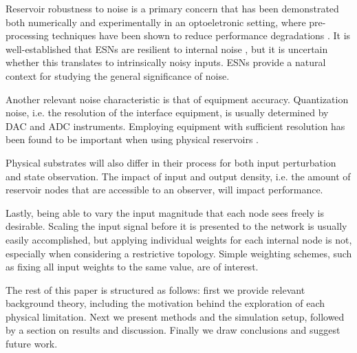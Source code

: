 Reservoir robustness to noise is a primary concern that has been demonstrated
both numerically and experimentally in an optoeletronic setting, where
pre-processing techniques have been shown to reduce performance degradations
\cite{soriano_optoelectronic_2013}. It is well-established that ESNs are
resilient to internal noise \cite{jaeger_echo_2001}, but it is uncertain whether
this translates to intrinsically noisy inputs. ESNs provide a natural context
for studying the general significance of noise.

Another relevant noise characteristic is that of equipment
accuracy. Quantization noise, i.e. the resolution of the interface equipment, is
usually determined by DAC and ADC instruments. Employing equipment with
sufficient resolution has been found to be important when using physical
reservoirs \cite{soriano_delay-based_2015}.

Physical substrates will also differ in their process for both input
perturbation and state observation. The impact of input and output density,
i.e. the amount of reservoir nodes that are accessible to an observer, will
impact performance.

Lastly, being able to vary the input magnitude that each node sees freely is
desirable. Scaling the input signal before it is presented to the network is
usually easily accomplished, but applying individual weights for each internal
node is not, especially when considering a restrictive topology. Simple
weighting schemes, such as fixing all input weights to the same value, are of
interest.

The rest of this paper is structured as follows: first we provide relevant
background theory, including the motivation behind the exploration of each
physical limitation. Next we present methods and the simulation setup, followed
by a section on results and discussion. Finally we draw conclusions and suggest
future work.

